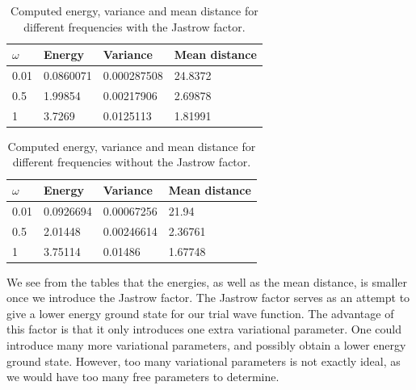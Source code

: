 \documentclass[12pt]{article}
\begin{document}
\begin{table}
\begin{center}
	\begin{tabular}{| l | l | l | l |}
	\hline
	 $\omega$ & Energy & Variance & Mean distance \\ \hline
	 0.01 & 0.0860071 & 0.000287508 & 24.8372 \\
	 0.5 & 1.99854 & 0.00217906 & 2.69878 \\
	 1 & 3.7269 & 0.0125113 & 1.81991 \\ \hline
	\end{tabular}
\caption{Computed energy, variance and mean distance for different frequencies with the Jastrow factor.}
\label{table:Jastrow-Result}
\end{center}
\end{table}

\begin{table}
\begin{center}
	\begin{tabular}{| l | l | l | l |}
	\hline
	 $\omega$ & Energy & Variance & Mean distance \\ \hline
	 0.01 & 0.0926694 & 0.00067256 & 21.94 \\
	 0.5 & 2.01448 & 0.00246614 & 2.36761 \\
	 1 & 3.75114 & 0.01486 & 1.67748 \\ \hline
	\end{tabular}
\caption{Computed energy, variance and mean distance for different frequencies without the Jastrow factor.}
\label{table:Non-Jastrow-Result}
\end{center}
\end{table}
We see from the tables that the energies, as well as the mean distance, is smaller once we introduce the Jastrow factor. The Jastrow factor serves as an attempt to give a lower energy ground state for our trial wave function. The advantage of this factor is that it only introduces one extra variational parameter. One could introduce many more variational parameters, and possibly obtain a lower energy ground state. However, too many variational parameters is not exactly ideal, as we would have too many free parameters to determine.
\FloatBarrier
\end{document}
